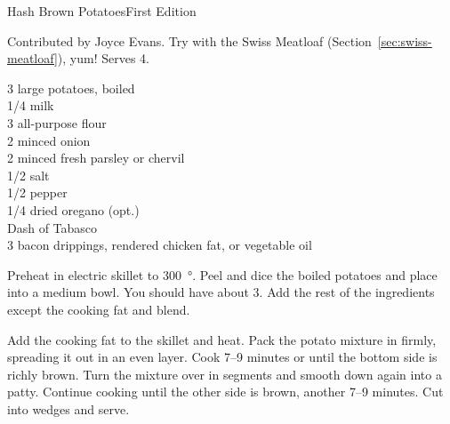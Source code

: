 \begin{entry}{Hash Brown Potatoes}{First Edition}

\begin{open}
  Contributed by Joyce Evans. Try with the Swiss Meatloaf
  (Section~\ref{sec:swiss-meatloaf}), yum! Serves 4.
\end{open}
\begin{ingredients}
  3 large potatoes, boiled \\
  \SI{1/4}{\cup} milk \\
  \SI{3}{\tblspoon} all-purpose flour \\
  \SI{2}{\tblspoon} minced onion \\
  \SI{2}{\tblspoon} minced fresh parsley or chervil \\
  \SI{1/2}{\teaspoon} salt \\
  \SI{1/2}{\teaspoon} pepper \\
  \SI{1/4}{\teaspoon} dried oregano (opt.) \\
  Dash of Tabasco \\
  \SI{3}{\tblspoon} bacon drippings, rendered chicken fat, or vegetable oil
\end{ingredients}
Preheat in electric skillet to \SI{300}{\degree}. Peel and dice the boiled
potatoes and place into a medium bowl. You should have about \SI{3}{\cup}. Add
the rest of the ingredients except the cooking fat and blend.

Add the cooking fat to the skillet and heat. Pack the potato mixture in
firmly, spreading it out in an even layer. Cook \numrange{7}{9} minutes or
until the bottom side is richly brown. Turn the mixture over in segments and
smooth down again into a patty. Continue cooking until the other side is
brown, another \numrange{7}{9} minutes.  Cut into wedges and serve.
\end{entry}

